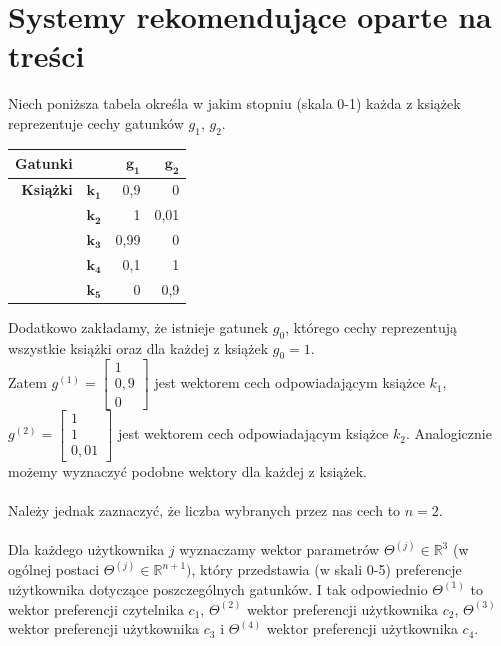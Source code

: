 \documentclass[12pt,a4paper]{report}
\begin{document}
{\section*{Systemy rekomendujące oparte na treści}
Niech poniższa tabela określa w jakim stopniu (skala 0-1) każda z książek reprezentuje cechy gatunków $g_1$, $g_2$.
\begin{center}
\begin{tabular}{|r|r|r|r|} \hline
\textbf{Gatunki} & & $\mathbf{g_1}$ & $\mathbf{g_2}$ \\
\hline
\hline
\textbf{Książki} &$\mathbf{k_1}$ & 0,9 & 0 \\
\hline
&$\mathbf{k_2}$ & 1 & 0,01 \\
\hline
&$\mathbf{k_3}$ & 0,99 & 0 \\
\hline
&$\mathbf{k_4}$ & 0,1 & 1 \\
\hline
&$\mathbf{k_5}$ & 0 & 0,9 \\
\hline
\end{tabular}
\end{center}
Dodatkowo zakładamy, że istnieje gatunek $g_0$, którego cechy reprezentują wszystkie książki oraz dla każdej z książek $g_0=1$.
\\Zatem $g^{(1)}= \left[
        \begin{array}{c}
         1 \\
         0,9\\
         0
         \end{array}
      \right] $ jest wektorem cech odpowiadającym książce $k_1$, $g^{(2)}= \left[
        \begin{array}{c}
         1 \\
         1\\
         0,01
         \end{array}
      \right] $ jest wektorem cech odpowiadającym książce $k_2$. Analogicznie możemy wyznaczyć podobne wektory dla każdej z książek.
\\
\\Należy jednak zaznaczyć, że liczba wybranych przez nas cech to $n=2$.
\\
\\Dla każdego użytkownika $j$ wyznaczamy wektor parametrów $\Theta^{(j)} \in \mathbb{R}^3$ (w ogólnej postaci $\Theta^{(j)} \in \mathbb{R}^{n+1})$, który przedstawia (w skali 0-5) preferencje użytkownika dotyczące poszczególnych gatunków. I tak odpowiednio $\Theta^{(1)}$ to wektor preferencji czytelnika $c_1$, $\Theta^{(2)}$ wektor preferencji użytkownika $c_2$, $\Theta^{(3)}$ wektor preferencji użytkownika $c_3$ i $\Theta^{(4)}$ wektor preferencji użytkownika $c_4$.
}
\end{document}
